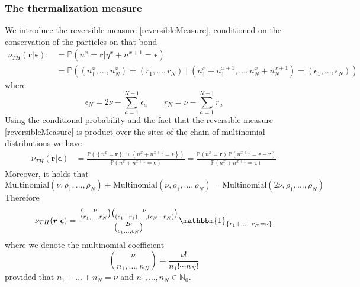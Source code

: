 \documentclass[10pt]{article}
\numberwithin{equation}{section}
\numberwithin{equation}{subsection}
\begin{document}
\subsubsection{The thermalization measure}
We introduce the reversible measure \eqref{reversibleMeasure}, conditioned on the conservation of the particles on that bond
\begin{equation}
	\begin{split}
	\nu_{TH}(\bm{r}|\bm{\epsilon}):&=\mathbb{P}\left(n^{x}=\bm{r}|\eta^{x}+n^{x+1}=\bm{\epsilon}\right)
	\\&
	=\mathbb{P}\left((n_{1}^{x},\ldots,n_{N}^{x})=
	(r_{1},\ldots,r_{N})\;|\;(n_{1}^{x}+n_{1}^{x+1},\ldots,n_{N}^{x}+n_{N}^{x+1})=(\epsilon_{1},\ldots,\epsilon_{N})\right)
	\end{split}
\end{equation}
where
\begin{equation}
	\epsilon_{N}=2\nu-\sum_{a=1}^{N-1}\epsilon_{a}\qquad r_{N}=\nu-\sum_{a=1}^{N-1}r_{a}
\end{equation}
 Using the conditional probability and the fact that the reversible measure \eqref{reversibleMeasure} is product over the sites of the chain of multinomial distributions we have
\begin{equation}
	\begin{split}
\nu_{TH}(\bm{r}|\bm{\epsilon})&=\frac{\mathbb{P}\left(\left\{n^{x}=\bm{r}\right\}\,\cap\,\left\{n^{x}+n^{x+1}=\bm{\epsilon}\right\}\right)}{\mathbb{P}\left(n^{x}+n^{x+1}=\bm{\epsilon}\right)}=\frac{\mathbb{P}\left(n^{x}=\bm{r}\right)\,\mathbb{P}\left(n^{x+1}=\bm{\epsilon}-\bm{r}\right)}{\mathbb{P}\left(n^{x}+n^{x+1}=\bm{\epsilon}\right)}
	\end{split}
\end{equation}
Moreover, it holds that 
\begin{equation}
\text{Multinomial}(\nu,\rho_{1},\ldots,\rho_{N})+\text{Multinomial}(\nu,\rho_{1},\ldots,\rho_{N})=\text{Multinomial}(2\nu,\rho_{1},\ldots,\rho_{N})
\end{equation}
Therefore 
\begin{equation}
	\begin{split}
	\nu_{TH}(\bm{r}|\bm{\epsilon})=\frac{\binom{\nu}{r_{1},\ldots,r_{N}}\binom{\nu}{(\epsilon_{1}-r_{1}),\ldots,(\epsilon_{N}-r_{N})}}{\binom{2\nu}{\epsilon_{1}\ldots,\epsilon_{N}}}\mathbbm{1}_{\{r_{1}+\ldots+r_{N}=\nu\}}
	\end{split}
\end{equation}
where we denote the multinomial coefficient
\begin{equation}
	\binom{\nu}{n_{1},\ldots,n_{N}}=\frac{\nu!}{n_{1}!\cdots n_{N}!}
\end{equation}
provided that $n_{1}+\ldots+n_{N}=\nu$ and $n_{1},\ldots,n_{N}\in \mathbb{N}_{0}$. 
\end{document}
